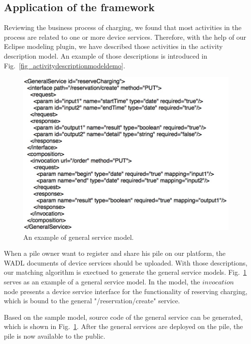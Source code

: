 \subsection{Application of the framework}
Reviewing the business process of charging, we found that most activities in the process are related to one or more device services. Therefore, with the help of our Eclipse modeling plugin, we have described those activities in the activity description model. An example of those descriptions is introduced in Fig.~\ref{fig_activitydescriptionmodeldemo}. 

\begin{figure}[!t]
\centering
\includegraphics[width=1.0\linewidth]{./graph/generalservicedemo}
\caption{An example of general service model.}
\label{fig_generalservicedemo}
\end{figure}

When a pile owner want to register and share his pile on our platform, the WADL documents of device services should be uploaded. With those descriptions, our matching algorithm is exectued to generate the general service models. Fig.~\ref{fig_generalservicedemo} serves as an example of a general service model.
In the model, the $invocation$ node presents a device service interface for the functionality of reserving charging, which is bound to the general "/reservation/create" service. 

Based on the sample model, source code of the general service can be generated, which is shown in Fig.~\ref{fig_generalservicedemo}. After the general services are deployed on the pile, the pile is now available to the public. 

